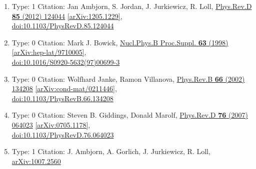 \documentclass[a4paper,10pt]{article}
\begin{document}
\begin{enumerate}
\begin{enumerate}
  \item Type: 1 Citation: Jan Ambjorn, S. Jordan, J. Jurkiewicz, R. Loll, \href{https://www.doi.org/10.1103/PhysRevD.85.124044}{Phys.Rev.D {\bf 85} (2012) 124044}  \href{https://arxiv.org/abs/1205.1229}{[arXiv:1205.1229]},\\\href{https://www.doi.org/10.1103/PhysRevD.85.124044}{doi:10.1103/PhysRevD.85.124044}
  \item Type: 0 Citation: Mark J. Bowick, \href{https://www.doi.org/10.1016/S0920-5632(97)00699-3}{Nucl.Phys.B Proc.Suppl. {\bf 63} (1998) }  \href{https://arxiv.org/abs/hep-lat/9710005}{[arXiv:hep-lat/9710005]},\\\href{https://www.doi.org/10.1016/S0920-5632(97)00699-3}{doi:10.1016/S0920-5632(97)00699-3}
  \item Type: 0 Citation: Wolfhard Janke, Ramon Villanova, \href{https://www.doi.org/10.1103/PhysRevB.66.134208}{Phys.Rev.B {\bf 66} (2002) 134208}  \href{https://arxiv.org/abs/cond-mat/0211446}{[arXiv:cond-mat/0211446]},\\\href{https://www.doi.org/10.1103/PhysRevB.66.134208}{doi:10.1103/PhysRevB.66.134208}
  \item Type: 0 Citation: Steven B. Giddings, Donald Marolf, \href{https://www.doi.org/10.1103/PhysRevD.76.064023}{Phys.Rev.D {\bf 76} (2007) 064023}  \href{https://arxiv.org/abs/0705.1178}{[arXiv:0705.1178]},\\\href{https://www.doi.org/10.1103/PhysRevD.76.064023}{doi:10.1103/PhysRevD.76.064023}
  \item Type: 1 Citation: J. Ambjorn, A. Gorlich, J. Jurkiewicz, R. Loll, \href{https://arxiv.org/abs/1007.2560}{arXiv:1007.2560}

\end{enumerate}
\end{enumerate}
\end{document}
